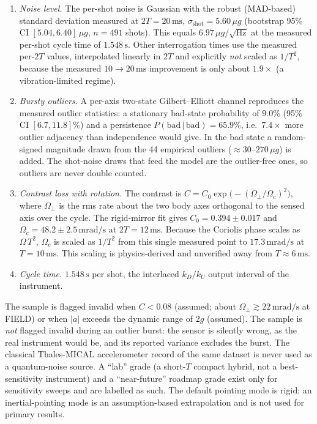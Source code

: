\documentclass[journal]{IEEEtran}
\begin{document}
\begin{enumerate}
\item \emph{Noise level.} The per-shot noise is Gaussian with the robust (MAD-based) standard deviation
  measured at $2T = 20\,\mathrm{ms}$, $\sigma_{\mathrm{shot}} = 5.60\,\mu g$ (bootstrap 95\% CI
  $[5.04, 6.40]\,\mu g$, $n = 491$ shots). This equals $6.97\,\mu g/\sqrt{\mathrm{Hz}}$ at the measured
  per-shot cycle time of $1.548\,\mathrm{s}$. Other interrogation times use the measured per-$2T$ values,
  interpolated linearly in $2T$ and explicitly \emph{not} scaled as $1/T^2$, because the measured
  $10\rightarrow 20\,\mathrm{ms}$ improvement is only about $1.9\times$ (a vibration-limited regime).
\item \emph{Bursty outliers.} A per-axis two-state Gilbert--Elliott channel reproduces the measured
  outlier statistics: a stationary bad-state probability of $9.0\%$ (95\% CI $[6.7, 11.8]\%$) and a
  persistence $P(\mathrm{bad}\,|\,\mathrm{bad}) = 65.9\%$, i.e.\ $7.4\times$ more outlier adjacency than
  independence would give. In the bad state a random-signed magnitude drawn from the 44 empirical
  outliers ($\approx 30$--$270\,\mu g$) is added. The shot-noise draws that feed the model are the
  outlier-free ones, so outliers are never double counted.
\item \emph{Contrast loss with rotation.} The contrast is $C = C_0\exp\!\big(-(\Omega_\perp/\Omega_c)^2\big)$,
  where $\Omega_\perp$ is the rms rate about the two body axes orthogonal to the sensed axis over the cycle.
  The rigid-mirror fit gives $C_0 = 0.394 \pm 0.017$ and $\Omega_c = 48.2 \pm 2.5\,\mathrm{mrad/s}$ at
  $2T = 12\,\mathrm{ms}$. Because the Coriolis phase scales as $\Omega\,T^2$, $\Omega_c$ is scaled as
  $1/T^2$ from this single measured point to $17.3\,\mathrm{mrad/s}$ at $T = 10\,\mathrm{ms}$. This scaling
  is physics-derived and unverified away from $T\approx 6\,\mathrm{ms}$.
\item \emph{Cycle time.} $1.548\,\mathrm{s}$ per shot, the interlaced $k_D/k_U$ output interval of the
  instrument.
\end{enumerate}
The sample is flagged invalid when $C < 0.08$ (assumed; about $\Omega_\perp \gtrsim 22\,\mathrm{mrad/s}$
at FIELD) or when $|a|$ exceeds the dynamic range of $2g$ (assumed). The sample is \emph{not} flagged
invalid during an outlier burst: the sensor is silently wrong, as the real instrument would be, and its
reported variance excludes the burst. The classical Thales-MICAL accelerometer record of the same dataset is
never used as a quantum-noise source. A ``lab'' grade (a short-$T$ compact hybrid, not a best-sensitivity
instrument) and a ``near-future'' roadmap grade exist only for sensitivity sweeps and are labelled as such.
The default pointing mode is rigid; an inertial-pointing mode is an assumption-based extrapolation and is
not used for primary results.
\end{document}
